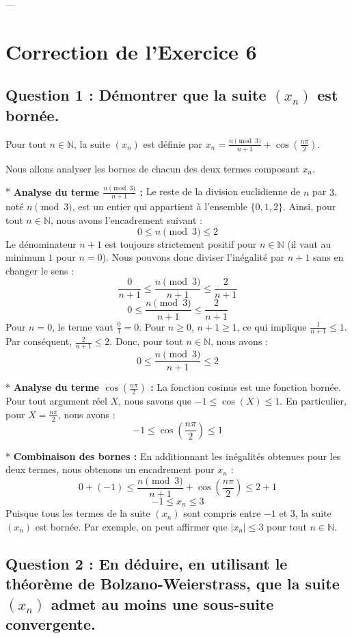 \documentclass{report}
\begin{document}
---

\chapter*{Correction de l'Exercice 6}

\section*{Question 1 : Démontrer que la suite $(x_n)$ est bornée.}

Pour tout $n \in \mathbb{N}$, la suite $(x_n)$ est définie par $x_n = \frac{n \pmod 3}{n+1} + \cos\left(\frac{n\pi}{2}\right)$.

Nous allons analyser les bornes de chacun des deux termes composant $x_n$.

*   \textbf{Analyse du terme $\frac{n \pmod 3}{n+1}$ :}
    Le reste de la division euclidienne de $n$ par $3$, noté $n \pmod 3$, est un entier qui appartient à l'ensemble $\{0, 1, 2\}$.
    Ainsi, pour tout $n \in \mathbb{N}$, nous avons l'encadrement suivant :
    $$0 \le n \pmod 3 \le 2$$
    Le dénominateur $n+1$ est toujours strictement positif pour $n \in \mathbb{N}$ (il vaut au minimum $1$ pour $n=0$). Nous pouvons donc diviser l'inégalité par $n+1$ sans en changer le sens :
    $$\frac{0}{n+1} \le \frac{n \pmod 3}{n+1} \le \frac{2}{n+1}$$
    $$0 \le \frac{n \pmod 3}{n+1} \le \frac{2}{n+1}$$
    Pour $n=0$, le terme vaut $\frac{0}{1} = 0$.
    Pour $n \ge 0$, $n+1 \ge 1$, ce qui implique $\frac{1}{n+1} \le 1$. Par conséquent, $\frac{2}{n+1} \le 2$.
    Donc, pour tout $n \in \mathbb{N}$, nous avons :
    $$0 \le \frac{n \pmod 3}{n+1} \le 2$$

*   \textbf{Analyse du terme $\cos\left(\frac{n\pi}{2}\right)$ :}
    La fonction cosinus est une fonction bornée. Pour tout argument réel $X$, nous savons que $-1 \le \cos(X) \le 1$.
    En particulier, pour $X = \frac{n\pi}{2}$, nous avons :
    $$-1 \le \cos\left(\frac{n\pi}{2}\right) \le 1$$

*   \textbf{Combinaison des bornes :}
    En additionnant les inégalités obtenues pour les deux termes, nous obtenons un encadrement pour $x_n$ :
    $$0 + (-1) \le \frac{n \pmod 3}{n+1} + \cos\left(\frac{n\pi}{2}\right) \le 2 + 1$$
    $$-1 \le x_n \le 3$$
    Puisque tous les termes de la suite $(x_n)$ sont compris entre $-1$ et $3$, la suite $(x_n)$ est bornée. Par exemple, on peut affirmer que $|x_n| \le 3$ pour tout $n \in \mathbb{N}$.

\section*{Question 2 : En déduire, en utilisant le théorème de Bolzano-Weierstrass, que la suite $(x_n)$ admet au moins une sous-suite convergente.}
\end{document}
